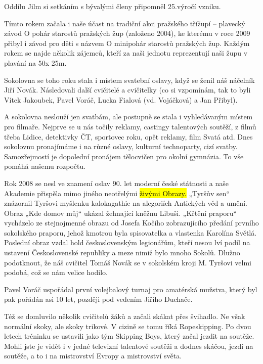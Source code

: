 Oddílu Jilm si setkáním s bývalými členy připomněl 25.výročí vzniku.

Tímto rokem začala i naše účast na tradiční akci pražského třížupí --
plavecký závod O pohár starostů pražských žup (založeno 2004), ke
kterému v roce 2009 přibyl i závod pro děti s názvem O minipohár
starostů pražských žup. Každým rokem se najde několik zájemců, kteří za
naši jednotu reprezentují naši župu v plavání na 50x 25m.

Sokolovna se toho roku stala i místem svatební oslavy, když se ženil náš
náčelník Jiří Novák. Následovali další cvičitelé a cvičitelky (co si
vzpomínám, tak to byli Vítek Jakoubek, Pavel Voráč, Lucka Fialová (vd.
Vojáčková) a Jan Přibyl).

A sokolovna neslouží jen svatbám, ale postupně se stala i vyhledávaným
místem pro filmaře. Nejprve se u nás točily reklamy, castingy
talentových soutěží, z filmů třeba Lidice, detektivky ČT, sportovec
roku, opět reklamy, film Svatá atd. Dnes sokolovnu pronajímáme i na
různé oslavy, kulturní technoparty, cizí svatby. Samozřejmostí je
dopolední pronájem tělocvičen pro okolní gymnázia. To vše pomáhá našemu
rozpočtu.

Rok 2008 se nesl ve znamení oslav 90. let moderní české státnosti a naše
Akademie přispěla mimo jiného neotřelými \hl{živými Obrazy.} „Tyršův
sen`` znázornil Tyršovi myšlenku kalokagathie na alegoriích Antických
věd a umění. Obraz „Kde domov můj`` ukázal žehnající kněžnu Libuši.
„Křtění praporu`` vycházelo ze stejnojmenné obrazu od Josefa Kočího
zobrazujícího předání prvního sokolského praporu, jehož kmotrou byla
spisovatelka a vlastenka Karolína Světlá. Poslední obraz vzdal hold
československým legionářům, kteří nesou lví podíl na ustavení
Československé republiky a meze nimiž bylo mnoho Sokolů. Dlužno
podotknout, že náš cvičitel Tomáš Novák se v sokolském kroji M. Tyršovi
velmi podobá, což se nám velice hodilo.

Pavel Voráč uspořádal první volejbalový turnaj pro amatérská mužstva,
který byl pak pořádán asi 10 let, později pod vedením Jiřího Duchače.

Též se domluvilo několik cvičitelů žáků a začali skákat přes švihadlo.
Ne však normální skoky, ale skoky trikové. V cizině se tomu říká
Ropeskipping. Po dvou letech tréninku se ustavili jako tým Skipping
Boys, který začal jezdit na soutěže. Mohli jste je vidět i v jedné
televizní talentové soutěži a dodnes skáčou, jezdí na soutěže, a to i na
mistrovství Evropy a mistrovství světa.

